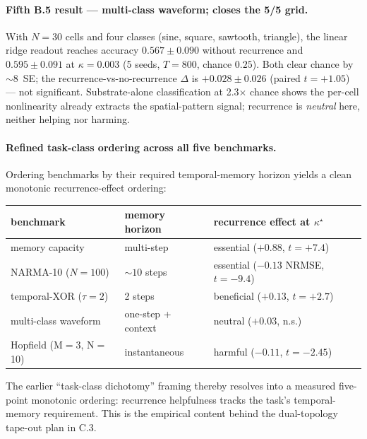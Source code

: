 \documentclass[fontsize=10pt]{article}
\begin{document}
\paragraph{Fifth B.5 result --- multi-class waveform; closes the 5/5 grid.}
With $N=30$ cells and four classes (sine, square, sawtooth, triangle),
the linear ridge readout reaches accuracy $0.567 \pm 0.090$ without
recurrence and $0.595 \pm 0.091$ at $\kappa=0.003$ (5 seeds, $T=800$,
chance $0.25$). Both clear chance by $\sim 8$~SE; the recurrence-vs-no-recurrence
$\Delta$ is $+0.028 \pm 0.026$ (paired $t = +1.05$) --- not significant.
Substrate-alone classification at 2.3$\times$ chance shows the per-cell
nonlinearity already extracts the spatial-pattern signal; recurrence
is \emph{neutral} here, neither helping nor harming.

\paragraph{Refined task-class ordering across all five benchmarks.}
Ordering benchmarks by their required temporal-memory horizon yields
a clean monotonic recurrence-effect ordering:
\begin{center}
\small
\begin{tabular}{lll}
\hline
benchmark & memory horizon & recurrence effect at $\kappa^\star$ \\
\hline
memory capacity                 & multi-step          & essential ($+0.88$, $t=+7.4$)        \\
NARMA-10 ($N=100$)              & $\sim 10$ steps     & essential ($-0.13$ NRMSE, $t=-9.4$)  \\
temporal-XOR ($\tau{=}2$)       & 2 steps             & beneficial ($+0.13$, $t=+2.7$)       \\
multi-class waveform            & one-step + context  & neutral ($+0.03$, n.s.)              \\
Hopfield (M$=$3, N$=$10)        & instantaneous       & harmful ($-0.11$, $t=-2.45$)         \\
\hline
\end{tabular}
\end{center}
The earlier ``task-class dichotomy'' framing thereby resolves into a
measured five-point monotonic ordering: recurrence helpfulness tracks
the task's temporal-memory requirement. This is the empirical content
behind the dual-topology tape-out plan in C.3.
\end{document}
